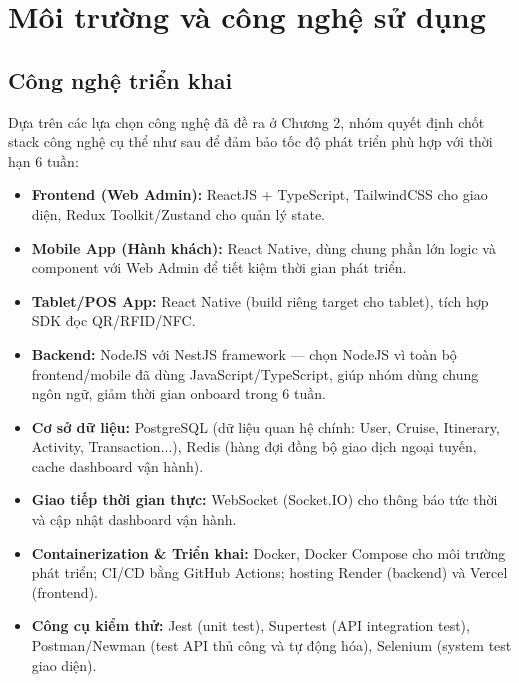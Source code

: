 \section{Môi trường và công nghệ sử dụng}

\subsection{Công nghệ triển khai}
Dựa trên các lựa chọn công nghệ đã đề ra ở Chương 2, nhóm quyết định chốt
stack công nghệ cụ thể như sau để đảm bảo tốc độ phát triển phù hợp với
thời hạn 6 tuần:

\begin{itemize}
    \item \textbf{Frontend (Web Admin):} ReactJS + TypeScript, TailwindCSS
    cho giao diện, Redux Toolkit/Zustand cho quản lý state.
    \item \textbf{Mobile App (Hành khách):} React Native, dùng chung phần
    lớn logic và component với Web Admin để tiết kiệm thời gian phát
    triển.
    \item \textbf{Tablet/POS App:} React Native (build riêng target cho
    tablet), tích hợp SDK đọc QR/RFID/NFC.
    \item \textbf{Backend:} NodeJS với NestJS framework — chọn NodeJS vì
    toàn bộ frontend/mobile đã dùng JavaScript/TypeScript, giúp nhóm dùng
    chung ngôn ngữ, giảm thời gian onboard trong 6 tuần.
    \item \textbf{Cơ sở dữ liệu:} PostgreSQL (dữ liệu quan hệ chính:
    User, Cruise, Itinerary, Activity, Transaction...), Redis (hàng đợi
    đồng bộ giao dịch ngoại tuyến, cache dashboard vận hành).
    \item \textbf{Giao tiếp thời gian thực:} WebSocket (Socket.IO) cho
    thông báo tức thời và cập nhật dashboard vận hành.
    \item \textbf{Containerization \& Triển khai:} Docker, Docker
    Compose cho môi trường phát triển; CI/CD bằng GitHub Actions; hosting
    Render (backend) và Vercel (frontend).
    \item \textbf{Công cụ kiểm thử:} Jest (unit test), Supertest (API
    integration test), Postman/Newman (test API thủ công và tự động
    hóa), Selenium (system test giao diện).
\end{itemize}


